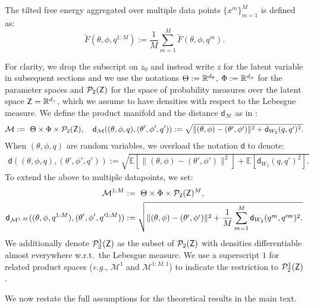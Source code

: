 The tilted free energy aggregated over multiple data points $\{x^m\}_{m=1}^M$ is defined as:
\begin{equation}
    \tilde{F}(\theta, \phi, q^{1:M}) := \frac{1}{M}\sum_{m=1}^M \tilde{F}(\theta, \phi, q^m).
\end{equation}

For clarity, we drop the subscript on $z_0$ and instead write $z$ for the latent variable in subsequent sections and we use the notations $\Theta:=\mathbb{R}^{d_\theta}$, $\Phi:=\mathbb{R}^{d_\phi}$ for the parameter spaces and $\mathcal{P}_2({\mathsf{Z}})$ for the space of probability measures over the latent space ${\mathsf{Z}}=\mathbb{R}^{d_z}$, which we assume to have densities with respect to the Lebesgue measure. We define the product manifold and the distance $\mathsf{d}_{\mathcal{M}}$ as in :
\begin{align}
    \mathcal{M} := \ \Theta \times \Phi \times \mathcal{P}_2({\mathsf{Z}}), \quad 
    \mathsf{d}_{\mathcal{M}}((\theta, \phi, q), (\theta', \phi', q')) := \sqrt{
    \|(\theta,\phi)-(\theta',\phi')\|^2 + \mathsf{d}_{W_2}(q, q')^2.
    }\label{eq:single_datapoint_prodmetric}
\end{align}
When $(\theta, \phi, q)$ are random variables, we overload the notation $\mathsf{d}$ to denote:
\begin{align}
\mathsf{d}((\theta, \phi, q), (\theta', \phi', q')) := \sqrt{
    \mathbb{E}[\|(\theta,\phi)-(\theta',\phi')\|^2] + \mathbb{E}[\mathsf{d}_{W_2}(q, q')^2].
    }\label{eq:random_variable_metric}
\end{align}
To extend the above to multiple datapoints, we set:
\begin{align}
    \mathcal{M}^{1:M}&:= \ \Theta \times \Phi \times \mathcal{P}_2({\mathsf{Z}})^M, \\
    \mathsf{d}_{\mathcal{M}^{1:M}}((\theta, \phi, q^{1:M}), (\theta', \phi', q'^{1:M})) &:= \sqrt{
    \|(\theta,\phi)-(\theta',\phi')\|^2 + \frac{1}{M}\sum_{m=1}^M \mathsf{d}_{W_2}(q^m, q'^m)^2.\label{eq:multi_datapoint_prodmetric}
    }
\end{align}
We additionally denote $\mathcal{P}_2^1({\mathsf{Z}})$ as the subset of $\mathcal{P}_2({\mathsf{Z}})$ with densities differentiable almost everywhere w.r.t.~the Lebesgue measure. We use a superscript $1$ for related product spaces (\emph{e.g.}, $\mathcal{M}^1$ and $\mathcal{M}^{1:M,1}$) to indicate the restriction to $\mathcal{P}_2^1({\mathsf{Z}})$.

We now restate the full assumptions for the theoretical results in the main text. 
\modelregularityrestatable*
\solutionregularityrestatable*
\stronglogconcavityrestatable*

